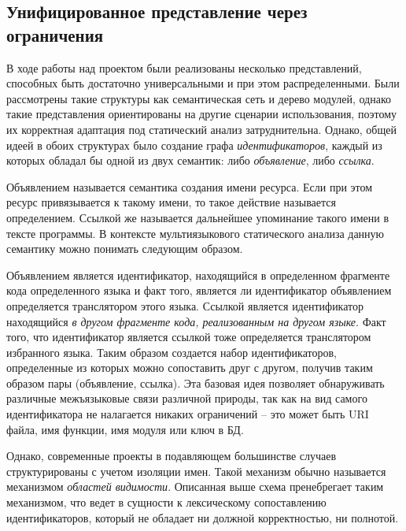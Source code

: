 \subsection{Унифицированное представление через ограничения} \label{ssec:constraints-desc}

В ходе работы над проектом были реализованы несколько представлений, способных быть достаточно универсальными
и при этом распределенными. Были рассмотрены такие структуры как семантическая сеть и дерево модулей, однако
такие представления ориентированы на другие сценарии использования, поэтому их корректная
адаптация под статический анализ затруднительна. Однако, общей идеей в обоих структурах было 
создание графа \textit{идентификаторов}, каждый из которых обладал бы одной из двух
семантик: либо \textit{объявление}, либо \textit{ссылка}.

Объявлением называется семантика создания имени ресурса. Если при этом ресурс привязывается к такому имени, то
такое действие называется определением. Ссылкой же называется дальнейшее упоминание такого имени в тексте
программы. В контексте мультиязыкового статического анализа данную семантику можно понимать следующим образом.

Объявлением является идентификатор, находящийся в определенном фрагменте кода определенного языка и факт того, является
ли идентификатор объявлением определяется транслятором этого языка. Ссылкой является идентификатор находящийся \textit{в
другом фрагменте кода, реализованным на другом языке}. Факт того, что идентификатор является ссылкой тоже определяется
транслятором избранного языка. Таким образом создается набор идентификаторов, определенные из которых можно сопоставить друг
с другом, получив таким образом пары (объявление, ссылка).
Эта базовая идея позволяет обнаруживать различные межъязыковые связи различной природы, так как на вид самого идентификатора
не налагается никаких ограничений -- это может быть URI файла, имя функции, имя модуля или ключ в БД.

Однако, современные проекты в подавляющем большинстве случаев структурированы с учетом изоляции имен. Такой механизм
обычно называется механизмом \textit{областей видимости}. Описанная выше схема пренебрегает таким механизмом, что
ведет в сущности к лексическому сопоставлению идентификаторов, который не обладает ни должной корректностью, ни полнотой.

